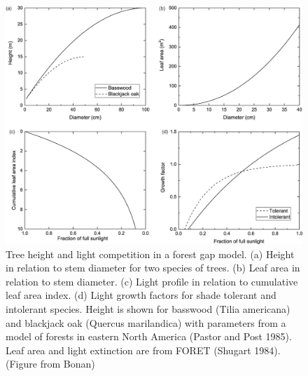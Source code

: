 \documentclass[12pt,oneside]{book}
\begin{document}
\begin{figure}

{\centering \includegraphics[width=0.8\linewidth]{figures/chap6/f624_growthfactor} 

}

\caption{Tree height and light competition in a forest gap model. (a) Height in relation to stem diameter for two species of trees. (b) Leaf area in relation to stem diameter. (c) Light profile in relation to cumulative leaf area index. (d) Light growth factors for shade tolerant and intolerant species. Height is shown for basswood (Tilia americana) and blackjack oak (Quercus marilandica) with parameters from a model of forests in eastern North America (Pastor and Post 1985). Leaf area and light extinction are from FORET (Shugart 1984). (Figure from Bonan)}\label{fig:f624}
\end{figure}
\end{document}
